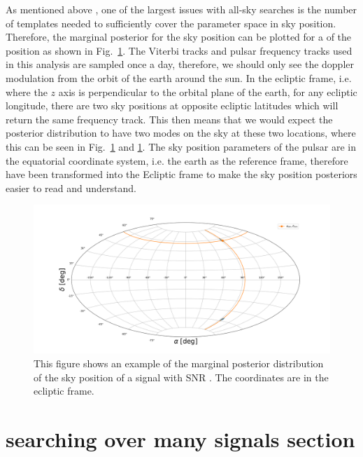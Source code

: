 As mentioned above , one of the largest issues with all-sky searches is the number of templates needed to sufficiently cover the parameter space in sky position. 
Therefore, the marginal posterior for the sky position can be plotted for a  of the position as shown in Fig.~\ref{}.
The Viterbi tracks and pulsar frequency tracks used in this analysis are sampled once a day, therefore, we should only see the doppler modulation from the orbit of the earth around the sun.
In the ecliptic frame, i.e. where the $z$ axis is perpendicular to the orbital plane of the earth, for any ecliptic longitude, there are two sky positions at opposite ecliptic latitudes which will return the same frequency track. 
This then means that we would expect the posterior distribution to have two modes on the sky at these two locations, where this can be seen in Fig.~\ref{} and \ref{}.
The sky position parameters of the pulsar are in the equatorial coordinate system, i.e. the earth as the reference frame, therefore have been transformed into the Ecliptic frame to make the sky position posteriors easier to read and understand.
%
\begin{figure}[ht]
    \centering
    \includegraphics[width=\linewidth]{C5_parameter/skypos_ecliptic.png}
    \caption[Example of posterior of sky position]{This figure shows an example of the marginal posterior distribution of the sky position of a signal with \gls{SNR} . The coordinates are in the ecliptic frame.}
    \label{par_est:results:example_posterier}
    
\end{figure}
%

\section{searching over many signals section }


